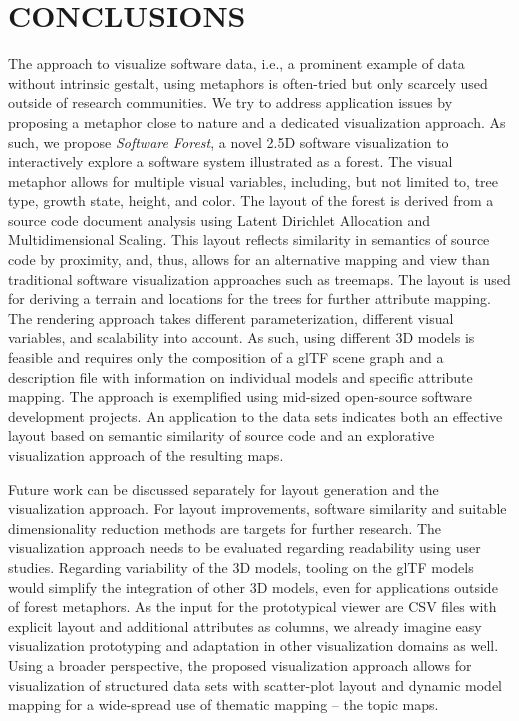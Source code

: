 \documentclass[a4paper,twoside]{article}
\begin{document}
\section{\uppercase{Conclusions}}
\label{sec:conclusion}
\noindent
The approach to visualize software data, i.e., a prominent example of data without intrinsic gestalt, using metaphors is often-tried but only scarcely used outside of research communities.
We try to address application issues by proposing a metaphor close to nature and a dedicated visualization approach.
As such, we propose \emph{Software Forest}, a novel 2.5D software visualization to interactively explore a software system illustrated as a forest.
The visual metaphor allows for multiple visual variables, including, but not limited to, tree type, growth state, height, and color.
The layout of the forest is derived from a source code document analysis using Latent Dirichlet Allocation and Multidimensional Scaling.
This layout reflects similarity in semantics of source code by proximity, and, thus, allows for an alternative mapping and view than traditional software visualization approaches such as treemaps.
The layout is used for deriving a terrain and locations for the trees for further attribute mapping.
The rendering approach takes different parameterization, different visual variables, and scalability into account.
As such, using different 3D models is feasible and requires only the composition of a glTF scene graph and a description file with information on individual models and specific attribute mapping.
The approach is exemplified using mid-sized open-source software development projects.
An application to the data sets indicates both an effective layout based on semantic similarity of source code and an explorative visualization approach of the resulting maps.

\par
Future work can be discussed separately for layout generation and the visualization approach.
For layout improvements, software similarity \cite{almsiedeen2013-similarity} and suitable dimensionality reduction methods \cite{cha2007comprehensive,vernier2020-reduction} are targets for further research.
The visualization approach needs to be evaluated regarding readability using user studies.
Regarding variability of the 3D models, tooling on the glTF models would simplify the integration of other 3D models, even for applications outside of forest metaphors.
As the input for the prototypical viewer are CSV files with explicit layout and additional attributes as columns, we already imagine easy visualization prototyping and adaptation in other visualization domains as well.
Using a broader perspective, the proposed visualization approach allows for visualization of structured data sets with scatter-plot layout and dynamic model mapping for a wide-spread use of thematic mapping -- the topic maps.
\end{document}
